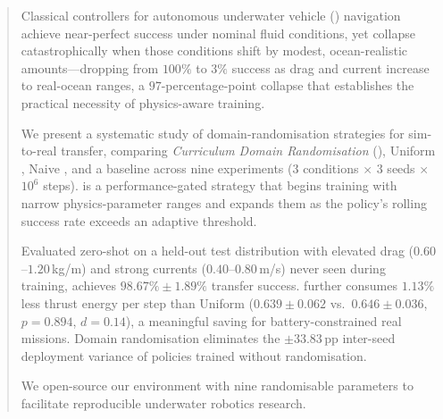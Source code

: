 
\begin{abstract}
Classical \PID{} controllers for autonomous underwater vehicle (\AUV{})
navigation achieve near-perfect success under nominal fluid conditions,
yet collapse catastrophically when those conditions shift by modest,
ocean-realistic amounts---dropping from $100\%$ to $3\%$ success as
drag and current increase to real-ocean ranges, a $97$-percentage-point
collapse that establishes the practical necessity of physics-aware training.

We present a systematic study of domain-randomisation strategies for
\AUV{} sim-to-real transfer, comparing \emph{Curriculum Domain
Randomisation} (\CDR{}), Uniform \DR{}, Naive \SAC{}, and a \PID{}
baseline across nine experiments ($3$ conditions $\times$ $3$ seeds
$\times$ $10^6$ steps).
\CDR{} is a performance-gated strategy that begins training with narrow
physics-parameter ranges and expands them as the policy's rolling success
rate exceeds an adaptive threshold.

Evaluated zero-shot on a held-out test distribution with elevated drag
($0.60$--$1.20$\,kg/m) and strong currents ($0.40$--$0.80$\,m/s)
never seen during training, \CDR{} achieves
$98.67\% \pm 1.89\%$ transfer success.
\CDR{} further consumes $1.13\%$ less thrust energy per step
than Uniform \DR{}
($0.639 \pm 0.062$ vs.\ $0.646 \pm 0.036$,
$p {=} 0.894$, $d {=} 0.14$),
a meaningful saving for battery-constrained real \AUV{} missions.
Domain randomisation eliminates the $\pm 33.83$\,pp
inter-seed deployment variance of policies trained without
randomisation.

We open-source our \MuJoCo{} \AUV{} environment with nine randomisable
parameters to facilitate reproducible underwater robotics research.
\end{abstract}